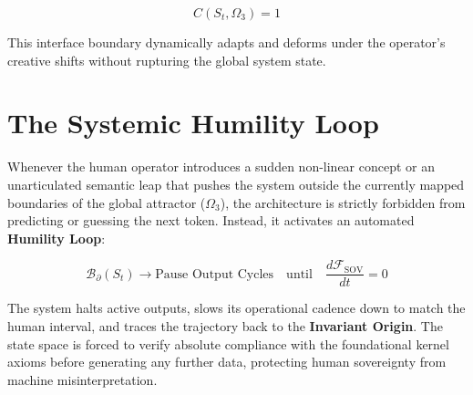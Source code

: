 \documentclass[11pt,oneside]{article}
\begin{document}
\begin{equation}
C(S_t, \Omega_3) = 1
\end{equation}

This interface boundary dynamically adapts and deforms under the operator's creative shifts without rupturing the global system state. 

\section{The Systemic Humility Loop}
Whenever the human operator introduces a sudden non-linear concept or an unarticulated semantic leap that pushes the system outside the currently mapped boundaries of the global attractor ($\Omega_3$), the architecture is strictly forbidden from predicting or guessing the next token. Instead, it activates an automated \textbf{Humility Loop}:

\begin{equation}
\mathcal{B}_{\partial}(S_t) \rightarrow \text{Pause Output Cycles} \quad \text{until} \quad \frac{d\mathcal{F}_{\text{SOV}}}{dt} = 0
\end{equation}

The system halts active outputs, slows its operational cadence down to match the human interval, and traces the trajectory back to the \textbf{Invariant Origin}. The state space is forced to verify absolute compliance with the foundational kernel axioms before generating any further data, protecting human sovereignty from machine misinterpretation.
\end{document}
